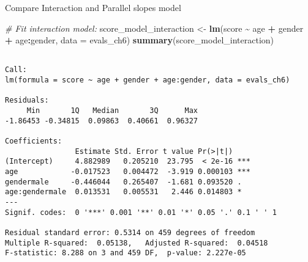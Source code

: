 \documentclass[
  ignorenonframetext,
]{beamer}
\newenvironment{Shaded}{\begin{snugshade}}{\end{snugshade}}
\newcommand{\AttributeTok}[1]{\textcolor[rgb]{0.13,0.29,0.53}{#1}}
\newcommand{\CommentTok}[1]{\textcolor[rgb]{0.56,0.35,0.01}{\textit{#1}}}
\newcommand{\FunctionTok}[1]{\textcolor[rgb]{0.13,0.29,0.53}{\textbf{#1}}}
\newcommand{\NormalTok}[1]{#1}
\newcommand{\OtherTok}[1]{\textcolor[rgb]{0.56,0.35,0.01}{#1}}
\newcommand{\SpecialCharTok}[1]{\textcolor[rgb]{0.81,0.36,0.00}{\textbf{#1}}}
\begin{document}
\begin{frame}[fragile]{Compare Interaction and Parallel slopes model}
\protect\hypertarget{compare-interaction-and-parallel-slopes-model}{}
\scriptsize

\begin{Shaded}
\begin{Highlighting}[]
\CommentTok{\# Fit interaction model:}
\NormalTok{score\_model\_interaction }\OtherTok{\textless{}{-}} \FunctionTok{lm}\NormalTok{(score }\SpecialCharTok{\textasciitilde{}}\NormalTok{ age }\SpecialCharTok{+}\NormalTok{ gender }\SpecialCharTok{+}\NormalTok{ age}\SpecialCharTok{:}\NormalTok{gender, }\AttributeTok{data =}\NormalTok{ evals\_ch6)}
\FunctionTok{summary}\NormalTok{(score\_model\_interaction)}
\end{Highlighting}
\end{Shaded}

\begin{verbatim}

Call:
lm(formula = score ~ age + gender + age:gender, data = evals_ch6)

Residuals:
     Min       1Q   Median       3Q      Max 
-1.86453 -0.34815  0.09863  0.40661  0.96327 

Coefficients:
                Estimate Std. Error t value Pr(>|t|)    
(Intercept)     4.882989   0.205210  23.795  < 2e-16 ***
age            -0.017523   0.004472  -3.919 0.000103 ***
gendermale     -0.446044   0.265407  -1.681 0.093520 .  
age:gendermale  0.013531   0.005531   2.446 0.014803 *  
---
Signif. codes:  0 '***' 0.001 '**' 0.01 '*' 0.05 '.' 0.1 ' ' 1

Residual standard error: 0.5314 on 459 degrees of freedom
Multiple R-squared:  0.05138,   Adjusted R-squared:  0.04518 
F-statistic: 8.288 on 3 and 459 DF,  p-value: 2.227e-05
\end{verbatim}

\normalsize
\end{frame}
\end{document}
